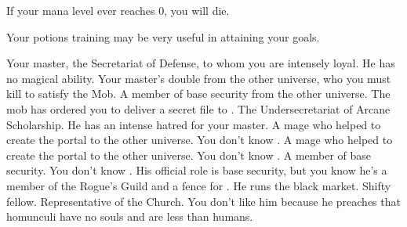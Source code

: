 \documentclass[char]{guildcamp3}
\begin{document}
\begin{itemz}[Notes]
  \item If your mana level ever reaches 0, you will die.
  \item Your potions training may be very useful in attaining your goals.
\end{itemz}


\begin{contacts}
  \contact{\cNobleOne{}} Your master, the Secretariat of Defense, to whom you are intensely loyal. He has no magical ability.
  \contact{\cPoliOne{}} Your master's double from the other universe, who you must kill to satisfy the Mob.
  \contact{\cSpecOpTwo{}} A member of base security from the other universe. The mob has ordered you to deliver a secret file to \cSpecOpTwo{\them}. 
  \contact{\cNobleTwo{}} The Undersecretariat of Arcane Scholarship. He has an intense hatred for your master.
  \contact{\cMageOne{}} A mage who helped to create the portal to the other universe. You don't know \cMageOne{\them}.
  \contact{\cMageTwo{}} A mage who helped to create the portal to the other universe. You don't know \cMageTwo{\them}.
  \contact{\cRogueOne{}} A member of base security. You don't know \cRogueOne{\them}.
  \contact{\cRogueTwo{}} His official role is base security, but you know he's a member of the Rogue's Guild and a fence for \bMagicMob{}. He runs the black market. Shifty fellow.
  \contact{\cPaladin} Representative of the Church. You don't like him because he preaches that homunculi have no souls and are less than humans.
\end{contacts}
\end{document}
